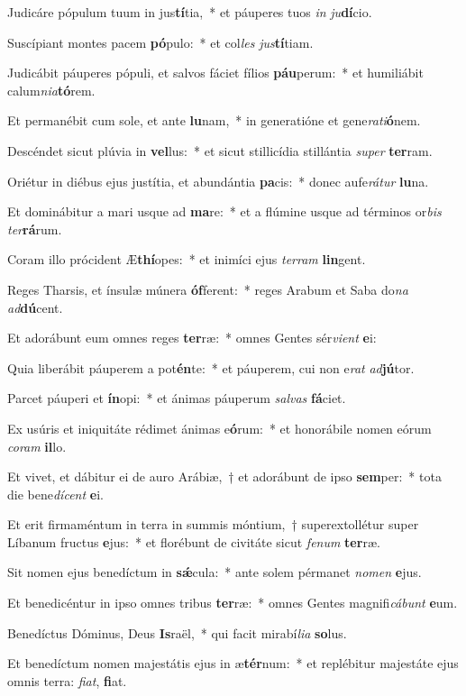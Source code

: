 \item Judicáre pópulum tuum in jus\textbf{tí}tia,~* et páuperes tuos \textit{in} \textit{ju}\textbf{dí}cio.
\item Suscípiant montes pacem \textbf{pó}pulo:~* et col\textit{les} \textit{jus}\textbf{tí}tiam.
\item Judicábit páuperes pópuli, et salvos fáciet fílios \textbf{páu}perum:~* et humiliábit calum\textit{ni}\textit{a}\textbf{tó}rem.
\item Et permanébit cum sole, et ante \textbf{lu}nam,~* in generatióne et gene\textit{ra}\textit{ti}\textbf{ó}nem.
\item Descéndet sicut plúvia in \textbf{vel}lus:~* et sicut stillicídia stillántia \textit{su}\textit{per} \textbf{ter}ram.
\item Oriétur in diébus ejus justítia, et abundántia \textbf{pa}cis:~* donec aufe\textit{rá}\textit{tur} \textbf{lu}na.
\item Et dominábitur a mari usque ad \textbf{ma}re:~* et a flúmine usque ad términos or\textit{bis} \textit{ter}\textbf{rá}rum.
\item Coram illo prócident Æ\textbf{thí}opes:~* et inimíci ejus \textit{ter}\textit{ram} \textbf{lin}gent.
\item Reges Tharsis, et ínsulæ múnera \textbf{óf}ferent:~* reges Arabum et Saba do\textit{na} \textit{ad}\textbf{dú}cent.
\item Et adorábunt eum omnes reges \textbf{ter}ræ:~* omnes Gentes sér\textit{vi}\textit{ent} \textbf{e}i:
\item Quia liberábit páuperem a pot\textbf{én}te:~* et páuperem, cui non e\textit{rat} \textit{ad}\textbf{jú}tor.
\item Parcet páuperi et \textbf{ín}opi:~* et ánimas páuperum \textit{sal}\textit{vas} \textbf{fá}ciet.
\item Ex usúris et iniquitáte rédimet ánimas e\textbf{ó}rum:~* et honorábile nomen eórum \textit{co}\textit{ram} \textbf{il}lo.
\item Et vivet, et dábitur ei de auro Arábiæ,~† et adorábunt de ipso \textbf{sem}per:~* tota die bene\textit{dí}\textit{cent} \textbf{e}i.
\item Et erit firmaméntum in terra in summis móntium,~† superextollétur super Líbanum fructus \textbf{e}jus:~* et florébunt de civitáte sicut \textit{fe}\textit{num} \textbf{ter}ræ.
\item Sit nomen ejus benedíctum in \textbf{sǽ}cula:~* ante solem pérmanet \textit{no}\textit{men} \textbf{e}jus.
\item Et benedicéntur in ipso omnes tribus \textbf{ter}ræ:~* omnes Gentes magnifi\textit{cá}\textit{bunt} \textbf{e}um.
\item Benedíctus Dóminus, Deus \textbf{Is}raël,~* qui facit mirabí\textit{li}\textit{a} \textbf{so}lus.
\item Et benedíctum nomen majestátis ejus in æ\textbf{tér}num:~* et replébitur majestáte ejus omnis terra: \textit{fi}\textit{at}, \textbf{fi}at.
